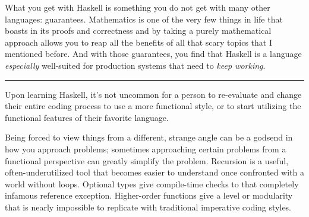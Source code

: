 \begin{foreword}
What you get with Haskell is something you do not get with many other languages: guarantees. Mathematics is one of the very few things in life that boasts in its proofs and correctness and by taking a purely mathematical approach allows you to reap all the benefits of all that scary topics that I mentioned before. 
And with those guarantees, you find that Haskell is a language \textit{especially} well-suited for production systems that need to \textit{keep working}.  

\rule{330pt}{1pt}

Upon learning Haskell, it's not uncommon for a person to re-evaluate and change their entire coding process to use a more functional style, or to start utilizing the functional features of their favorite language. 

Being forced to view things from a different, strange angle can be a godsend in how you approach problems; sometimes approaching certain problems from a functional perspective can greatly simplify the problem. Recursion is a useful, often-underutilized tool that becomes easier to understand once confronted with a world without loops. Optional types give compile-time checks to that completely infamous  reference exception. Higher-order functions give a level or modularity that is nearly impossible to replicate with traditional imperative coding styles. 



\end{foreword}

